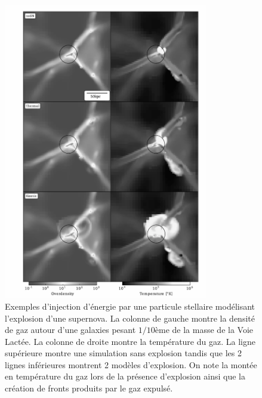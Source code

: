 \begin{figure}[htbp]
	\centering
		\includegraphics[height=13cm]{figs/SN.png}
	\caption[Exemples d'injection d'énergie par une particule stellaire modélisant l'explosion d'une supernova. ]{Exemples d'injection d'énergie par une particule stellaire modélisant l'explosion d'une supernova. La colonne de gauche montre la densité de gaz autour d'une galaxies pesant $1/10$ème de la masse de la Voie Lactée. La colonne de droite montre la température du gaz. La ligne supérieure montre une simulation sans explosion tandis que les 2 lignes inférieures montrent 2 modèles d'explosion. On note la montée en température du gaz lors de la présence d'explosion ainsi que la création de fronts produits par le gaz expulsé.}
	\label{f:SN}
\end{figure}

